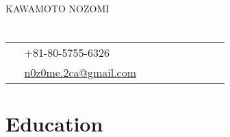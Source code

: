 \documentclass[10pt]{article} %
\begin{document}

\parbox[top][0.12\textheight][c]{\linewidth}{ %
	\vspace{-0.04\textheight} %
	{\color{name}\Huge KAWAMOTO NOZOMI}\\\medskip %
}

\begin{paracol}{2} %


\section{}
\parbox[top][0.12\textheight][c]{\linewidth}{ %
	\vspace{-0.01\textheight} %
	\colorbox{shade}{ %
		\begin{supertabular}{p{0.05\linewidth}|p{0.775\linewidth}} %
			\raisebox{-1pt}{\faPhone} & +81-80-5755-6326 \\ %
			\raisebox{0pt}{\small\faEnvelope} & \href{mailto:n0z0me.2ca@gmail.com}{n0z0me.2ca@gmail.com} \\ %
		\end{supertabular}
	}
}

\section{\Large Education}


\end{paracol}
\end{document}
